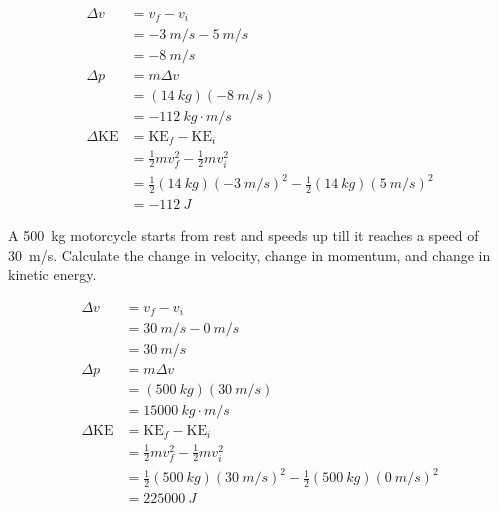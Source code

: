 \documentclass[../main-physics-problems.tex]{subfiles}
\begin{document}
\begin{questions}
\begin{solution}
\begin{align*}
    \Delta v &= v_f - v_i \\[1ex]
    &= \SI{-3}{m/s} - \SI{5}{m/s} \\[1ex]
    &= \boxed{\SI{-8}{m/s}} \\[2ex]
    \Delta p &= m \Delta v \\[1ex]
    &= (\SI{14}{kg})(\SI{-8}{m/s}) \\[1ex]
    &= \boxed{\SI{-112}{kg\cdot m/s}} \\[2ex]
    \Delta \mathrm{KE} &= \mathrm{KE}_f - \mathrm{KE}_i \\[1ex]
    &= \frac{1}{2}m v_f^2 - \frac{1}{2}mv_i^2 \\[1ex]
    &= \frac{1}{2}(\SI{14}{kg})(\SI{-3}{m/s})^2 - \frac{1}{2}(\SI{14}{kg}) (\SI{5}{m/s})^2 \\[1ex]
    &= \boxed{\SI{-112}{J}}
\end{align*}
\end{solution}

\ifprintanswers
    \clearpage
\fi

\question
A \SI{500}{kg} motorcycle starts from rest and speeds up till it reaches a speed of \SI{30}{m/s}. Calculate the change in velocity, change in momentum, and change in kinetic energy.

\begin{solution}
\begin{align*}
    \Delta v &= v_f - v_i \\[1ex]
    &= \SI{30}{m/s} - \SI{0}{m/s} \\[1ex]
    &= \boxed{\SI{30}{m/s}} \\[2ex]
    \Delta p &= m \Delta v \\[1ex]
    &= (\SI{500}{kg})(\SI{30}{m/s}) \\[1ex]
    &= \boxed{\SI{15000}{kg\cdot m/s}} \\[2ex]
    \Delta \mathrm{KE} &= \mathrm{KE}_f - \mathrm{KE}_i \\[1ex]
    &= \frac{1}{2}m v_f^2 - \frac{1}{2}mv_i^2 \\[1ex]
    &= \frac{1}{2}(\SI{500}{kg})(\SI{30}{m/s})^2 - \frac{1}{2}(\SI{500}{kg}) (\SI{0}{m/s})^2 \\[1ex]
    &= \boxed{\SI{225000}{J}}
\end{align*}
\end{solution}


\ifprintanswers
    \clearpage
\fi


\end{questions}
\end{document}
